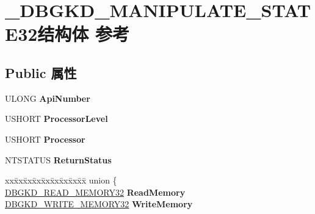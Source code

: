 \hypertarget{struct___d_b_g_k_d___m_a_n_i_p_u_l_a_t_e___s_t_a_t_e32}{}\section{\+\_\+\+D\+B\+G\+K\+D\+\_\+\+M\+A\+N\+I\+P\+U\+L\+A\+T\+E\+\_\+\+S\+T\+A\+T\+E32结构体 参考}
\label{struct___d_b_g_k_d___m_a_n_i_p_u_l_a_t_e___s_t_a_t_e32}
\subsection*{Public 属性}
\begin{DoxyCompactItemize}
\item 
\mbox{\label{struct___d_b_g_k_d___m_a_n_i_p_u_l_a_t_e___s_t_a_t_e32_ae132df8759430ef935058c6f35138494}} 
U\+L\+O\+NG {\bfseries Api\+Number}
\item 
\mbox{\label{struct___d_b_g_k_d___m_a_n_i_p_u_l_a_t_e___s_t_a_t_e32_aa47e9e99d77ec5e2a291c5b50a50fae9}} 
U\+S\+H\+O\+RT {\bfseries Processor\+Level}
\item 
\mbox{\label{struct___d_b_g_k_d___m_a_n_i_p_u_l_a_t_e___s_t_a_t_e32_a9606cdf01e4146dac93c8e49dc5539d0}} 
U\+S\+H\+O\+RT {\bfseries Processor}
\item 
\mbox{\label{struct___d_b_g_k_d___m_a_n_i_p_u_l_a_t_e___s_t_a_t_e32_a63ca6b02dde17e9134619bd1ff14e8a6}} 
N\+T\+S\+T\+A\+T\+US {\bfseries Return\+Status}
\item 
\mbox{\label{struct___d_b_g_k_d___m_a_n_i_p_u_l_a_t_e___s_t_a_t_e32_a99cb7229ef55979414b91d826dadfa75}} 
\begin{tabbing}
xx\=xx\=xx\=xx\=xx\=xx\=xx\=xx\=xx\=\kill
union \{\\
\>\hyperlink{struct___d_b_g_k_d___r_e_a_d___m_e_m_o_r_y32}{DBGKD\_READ\_MEMORY32} {\bfseries ReadMemory}\\
\>\hyperlink{struct___d_b_g_k_d___w_r_i_t_e___m_e_m_o_r_y32}{DBGKD\_WRITE\_MEMORY32} {\bfseries WriteMemory}\\

\end{tabbing}
\end{DoxyCompactItemize}
